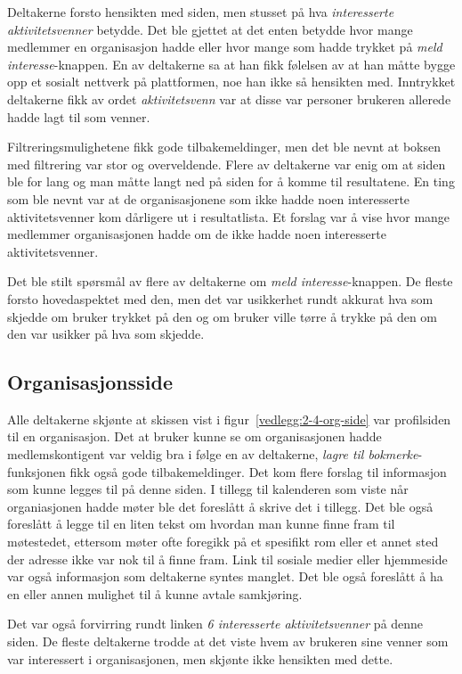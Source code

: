 Deltakerne forsto hensikten med siden, men stusset på hva {\em interesserte aktivitetsvenner} betydde. Det ble gjettet at det enten betydde hvor mange medlemmer en organisasjon hadde eller hvor mange som hadde trykket på {\em meld interesse}-knappen. En av deltakerne sa at han fikk følelsen av at han måtte bygge opp et sosialt nettverk på plattformen, noe han ikke så hensikten med. Inntrykket deltakerne fikk av ordet {\em aktivitetsvenn} var at disse var personer brukeren allerede hadde lagt til som venner.

Filtreringsmulighetene fikk gode tilbakemeldinger, men det ble nevnt at boksen med filtrering var stor og overveldende. Flere av deltakerne var enig om at siden ble for lang og man måtte langt ned på siden for å komme til resultatene. En ting som ble nevnt var at de organisasjonene som ikke hadde noen interesserte aktivitetsvenner kom dårligere ut i resultatlista. Et forslag var å vise hvor mange medlemmer organisasjonen hadde om de ikke hadde noen interesserte aktivitetsvenner.

Det ble stilt spørsmål av flere av deltakerne om {\em meld interesse}-knappen. De fleste forsto hovedaspektet med den, men det var usikkerhet rundt akkurat hva som skjedde om bruker trykket på den og om bruker ville tørre å trykke på den om den var usikker på hva som skjedde.


\subsection{Organisasjonsside}

Alle deltakerne skjønte at skissen vist i figur~\ref{vedlegg:2-4-org-side} var profilsiden til en organisasjon. Det at bruker kunne se om organisasjonen hadde medlemskontigent var veldig bra i følge en av deltakerne, {\em lagre til bokmerke}-funksjonen fikk også gode tilbakemeldinger. Det kom flere forslag til informasjon som kunne legges til på denne siden. I tillegg til kalenderen som viste når organiasjonen hadde møter ble det foreslått å skrive det i tillegg. Det ble også foreslått å legge til en liten tekst om hvordan man kunne finne fram til møtestedet, ettersom møter ofte foregikk på et spesifikt rom eller et annet sted der adresse ikke var nok til å finne fram. Link til sosiale medier eller hjemmeside var også informasjon som deltakerne syntes manglet. Det ble også foreslått å ha en eller annen mulighet til å kunne avtale samkjøring.

Det var også forvirring rundt linken {\em 6 interesserte aktivitetsvenner} på denne siden. De fleste deltakerne trodde at det viste hvem av brukeren sine venner som var interessert i organisasjonen, men skjønte ikke hensikten med dette.


